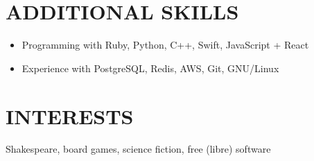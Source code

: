 \documentclass[centered, margin, 11pt]{res} %
\newcommand\mainsectionfont{\fontsize{10.5pt}{14pt}\selectfont\bf\textup}
\renewcommand\sectionfont{\mainsectionfont} %
\renewcommand\dates{\section} %
\newenvironment{rlist}
    {\begin{minipage}[t]{\linewidth}\begin{itemize}\raggedright}
    {\end{itemize}\end{minipage}}
\newenvironment{positionlist}
    {\begin{position}\begin{rlist}}
    {\end{rlist}\end{position}}
\begin{document}
\begin{resume}



\renewcommand\sectionfont{\mainsectionfont} %


\section{ADDITIONAL SKILLS}
\begin{rlist}
  \item Programming with Ruby, Python, C++, Swift, JavaScript + React
  \item Experience with PostgreSQL, Redis, AWS, Git, GNU/Linux
\end{rlist}


\section{INTERESTS}
Shakespeare, board games, science fiction, free (libre) software


\end{resume}
\end{document}
